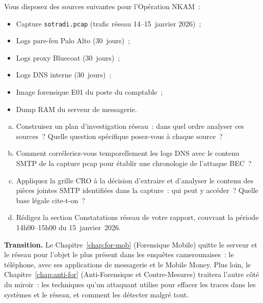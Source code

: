 \begin{boxexo}[title={\ding{45}\quad Exercice~15.3. Corrélation multi-sources \niveauexpert}]
Vous disposez des sources suivantes pour l'Opération NKAM~:
\begin{itemize}
    \item Capture \texttt{sotradi.pcap} (trafic réseau 14--15~janvier 2026)~;
    \item Logs pare-feu Palo Alto (30~jours)~;
    \item Logs proxy Bluecoat (30~jours)~;
    \item Logs DNS interne (30~jours)~;
    \item Image forensique E01 du poste du comptable~;
    \item Dump RAM du serveur de messagerie.
\end{itemize}
\begin{enumerate}[(a)]
    \item Construisez un plan d'investigation réseau~: dans quel ordre
          analyser ces sources~? Quelle question spécifique posez-vous
          à chaque source~?
    \item Comment corréleriez-vous temporellement les logs DNS avec
          le contenu SMTP de la capture pcap pour établir une
          chronologie de l'attaque BEC~?
    \item Appliquez la grille CRO à la décision d'extraire et d'analyser
          le contenu des pièces jointes SMTP identifiées dans la
          capture~: qui peut y accéder~? Quelle base légale cite-t-on~?
    \item Rédigez la section Constatations réseau de votre rapport,
          couvrant la période 14h00--15h00 du 15~janvier~2026.
\end{enumerate}
\end{boxexo}

\bigskip

\begin{boxinfo}
\textbf{Transition.} Le Chapitre~\ref{chap:for-mob} (Forensique
Mobile) quitte le serveur et le réseau pour l'objet le plus présent
dans les enquêtes camerounaises~: le téléphone, avec ses applications
de messagerie et le Mobile Money. Plus loin, le Chapitre~\ref{chap:anti-for}
(Anti-Forensique et Contre-Mesures) traitera l'autre côté du miroir~:
les techniques qu'un attaquant utilise pour effacer les traces dans
les systèmes et le réseau, et comment les détecter malgré tout.
\end{boxinfo}

